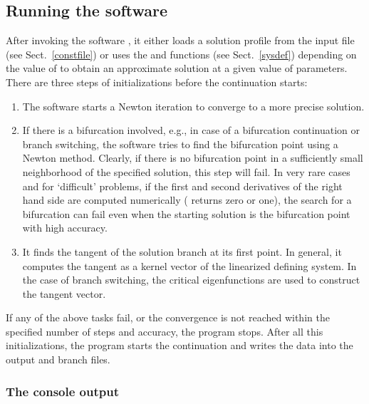 \documentclass[10pt,a4paper]{ddedoc}
\begin{document}
\subsection{Running the software}

After invoking the software , it either loads a solution profile
from the input file (see Sect.\ \ref{constfile}) or uses the 
 and  functions (see Sect.\ \ref{sysdef})
depending on the value of  to obtain an approximate solution at a
given value of parameters. There are three steps of initializations before the
continuation starts:
\begin{enumerate}
\item The software starts a Newton iteration to converge to a more precise
solution.
\item If there is a bifurcation involved, e.g., in case of a bifurcation
continuation or branch switching, the software tries to find the bifurcation
point using a Newton method. Clearly, if there is no bifurcation point in a
sufficiently small neighborhood of the specified solution, this step will fail.
In very rare cases and for `difficult' problems, if the first and second
derivatives of the right hand side are computed numerically (
returns zero or one), the search for a bifurcation can fail even when the
starting solution is the bifurcation point with high accuracy.
\item It finds the tangent of the solution branch at its first point. In
general, it computes the tangent as a kernel vector of the linearized defining
system. In the case of branch switching, the critical eigenfunctions are used to
construct the tangent vector.
\end{enumerate}
If any of the above tasks fail, or the convergence is not reached within the
specified number of steps and accuracy, the program stops.
After all this initializations, the program starts the continuation and writes
the data into the output and branch files.

\subsubsection{The console output}
\end{document}
